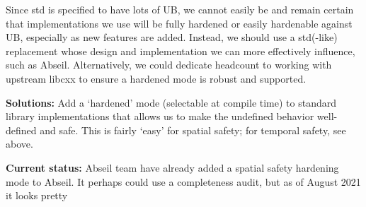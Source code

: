 \documentclass[a4paper,12pt,notitlepage,twoside,openright]{article}
\begin{document}
Since std is specified to have lots of UB, we cannot easily be and
remain certain that implementations we use will be fully hardened or
easily hardenable against UB, especially as new features are added.
Instead, we should use a std(-like) replacement whose design and
implementation we can more effectively influence, such as Abseil.
Alternatively, we could dedicate headcount to working with upstream
libcxx to ensure a hardened mode is robust and supported.

\textbf{Solutions:} Add a `hardened' mode (selectable at compile time)
to standard library implementations that allows us to make the undefined
behavior well-defined and safe. This is fairly `easy' for spatial
safety; for temporal safety, see above.

\textbf{Current status:} Abseil team have already added a
spatial safety hardening mode to Abseil. It perhaps could use a
completeness audit, but as of August 2021 it looks pretty
\end{document}
